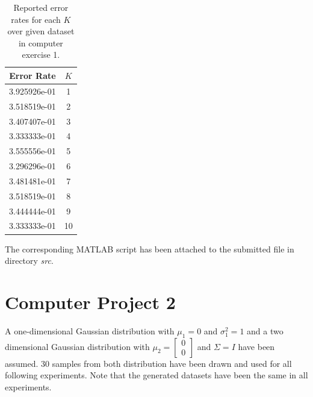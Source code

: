 \documentclass[12pt]{article}
\begin{document}
\begin{table}[h]
\centering
\caption{Reported error rates for each $K$ over given dataset in computer exercise 1.}
\label{tbl:4-1}
\begin{tabular}{c|c}
Error Rate & $K$ \\
\hline \hline 
3.925926e-01 & 1 \\
3.518519e-01 & 2 \\
3.407407e-01 & 3 \\
3.333333e-01 & 4 \\
3.555556e-01 & 5 \\
3.296296e-01 & 6 \\
3.481481e-01 & 7 \\
3.518519e-01 & 8 \\
3.444444e-01 & 9 \\
3.333333e-01 & 10 
\end{tabular}

\end{table}

The corresponding MATLAB script has been attached to the submitted file in directory \textit{src}.

\section{Computer Project 2}

A one-dimensional Gaussian distribution with $\mu_1 = 0$ and $\sigma_1^2 = 1$ and a two dimensional Gaussian distribution with $\mu_2 = \left[ \begin{matrix}
0 \\
0
\end{matrix}\right]$ and $\Sigma = I$ have been assumed. 30 samples from both distribution have been drawn and used for all following experiments. Note that the generated datasets have been the same in all experiments.
\end{document}
